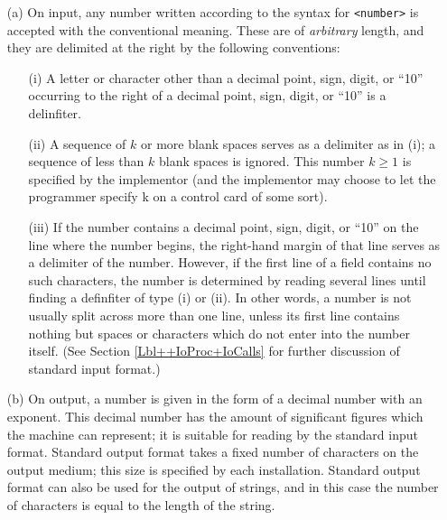 \documentclass[a4paper,11pt]{article}
\begin{document}
\begin{enumerate}

\item[(a)] On input, any number written according to the \Algol syntax
  for {\tt <number>} is accepted with the conventional meaning.  These
  are of {\it arbitrary} length, and they are delimited at the right
  by the following conventions:

  \begin{enumerate}
    \item[(i)] A letter or character other than a decimal point, sign,
      digit, or ``10'' occurring to the right of a decimal point,
      sign, digit, or ``10'' is a delinfiter.

    \item[(ii)] A sequence of $k$ or more blank spaces serves as a
      delimiter as in (i); a sequence of less than $k$ blank spaces is
      ignored. This number $k\geq1$ is specified by the implementor
      (and the implementor may choose to let the programmer specify k
      on a control card of some sort).

    \item[(iii)] If the number contains a decimal point, sign, digit,
      or ``10'' on the line where the number begins, the right-hand
      margin of that line serves as a delimiter of the number.
      However, if the first line of a field contains no such
      characters, the number is determined by reading several lines
      until finding a definfiter of type (i) or (ii).  In other words,
      a number is not usually split across more than one line, unless
      its first line contains nothing but spaces or characters which
      do not enter into the number itself.  (See Section
      \ref{Lbl++IoProc+IoCalls} for further discussion of standard
      input format.)
  \end{enumerate}

\item[(b)] On output, a number is given in the form of a decimal
  number with an exponent. This decimal number has the amount of
  significant figures which the machine can represent; it is suitable
  for reading by the standard input format.  Standard output format
  takes a fixed number of characters on the output medium; this size
  is specified by each \Algol installation.  Standard output format
  can also be used for the output of strings, and in this case the
  number of characters is equal to the length of the string.

\end{enumerate}
\end{document}
